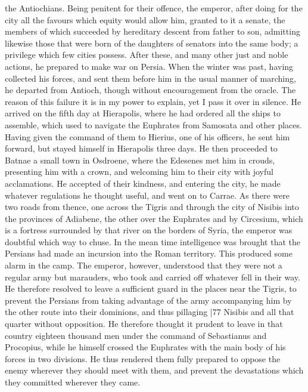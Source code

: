 the Antiochians. Being penitent for their offence, the emperor, after doing for the city all the favours which equity would allow him, granted to it a senate, the members of which succeeded by hereditary descent from father to son, admitting likewise those that were born of the daughters of senators into the same body; a privilege which few cities possess. After these, and many other just and noble actions, he prepared to make war on Persia. When the winter was past, having collected his forces, and sent them before him in the usual manner of marching, he departed from Antioch, though without encouragement from the oracle. The reason of this failure it is in my power to explain, yet I pass it over in silence. He arrived on the fifth day at Hierapolis, where he had ordered all the ships to assemble, which used to navigate the Euphrates from Samosata and other places. Having given the command of them to Hierius, one of his officers, he sent him forward, but stayed himself in Hierapolis three days. He then proceeded to Batnae a small town in Osdroene, where the Edesenes met him in crouds, presenting him with a crown, and welcoming him to their city with joyful acclamations. He accepted of their kindness, and entering the city, he made whatever regulations he thought useful, and went on to Carrae. As there were two roads from thence, one across the Tigris and through the city of Nisibis into the provinces of Adiabene, the other over the Euphrates and by Circesium, which is a fortress surrounded by that river on the borders of Syria, the emperor was doubtful which way to chuse. In the mean time intelligence was brought that the Persians had made an incursion into the Roman territory. This produced some alarm in the camp. The emperor, however, understood that they were not a regular army but marauders, who took and carried off whatever fell in their way. He therefore resolved to leave a sufficient guard in the places near the Tigris, to prevent the Persians from taking advantage of the army accompanying him by the other route into their dominions, and thus pillaging
|77 Nisibis and all that quarter without opposition. He therefore thought it prudent to leave in that country eighteen thousand men under the command of Sebastianus and Procopius, while he himself crossed the Euphrates with the main body of his forces in two divisions. He thus rendered them fully prepared to oppose the enemy wherever they should meet with them, and prevent the devastations which they committed wherever they came.

